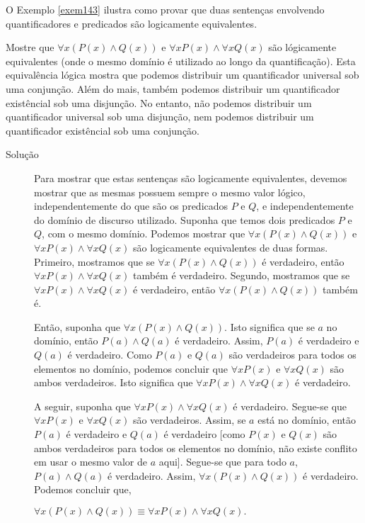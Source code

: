 O Exemplo \ref{exem143} ilustra como provar que duas sentenças envolvendo
quantificadores e predicados são logicamente equivalentes.

\label{exem143}
\begin{exmp}
Mostre que $\forall x(P(x) \land Q(x))$ e $\forall xP(x) \land \forall xQ(x)$
são lógicamente equivalentes (onde o mesmo domínio é utilizado ao longo da
quantificação). Esta equivalência lógica mostra que podemos distribuir um
quantificador universal sob uma conjunção. Além do mais, também podemos
distribuir um quantificador existêncial sob uma disjunção. No entanto, não
podemos distribuir um quantificador universal sob uma disjunção, nem podemos
distribuir um quantificador existêncial sob uma conjunção.
\end{exmp}

\begin{description}
\item[Solução] Para mostrar que estas sentenças são logicamente equivalentes,
devemos mostrar que as mesmas possuem sempre o mesmo valor lógico,
independentemente do que são os predicados $P$ e $Q$, e independentemente do
domínio de discurso utilizado. Suponha que temos dois predicados $P$ e $Q$, com
o mesmo domínio. Podemos mostrar que $\forall x(P(x) \land Q(x))$ e $\forall
xP(x) \land \forall xQ(x)$ são logicamente equivalentes de duas formas.
Primeiro, mostramos que se $\forall x(P(x) \land Q(x))$ é verdadeiro,
então $\forall xP(x) \land \forall xQ(x)$ também é verdadeiro. Segundo,
mostramos que se $\forall xP(x) \land \forall xQ(x)$ é verdadeiro, então
$\forall x(P(x) \land Q(x))$ também é.

Então, suponha que $\forall x(P(x) \land Q(x))$. Isto significa que se $a$ no
domínio, então $P(a) \land Q(a)$ é verdadeiro. Assim, $P(a)$ é verdadeiro e
$Q(a)$ é verdadeiro. Como $P(a)$ e $Q(a)$ são verdadeiros para todos os
elementos no domínio, podemos concluir que $\forall xP(x)$ e $\forall xQ(x)$ são
ambos verdadeiros. Isto significa que $\forall xP(x) \land \forall xQ(x)$ é
verdadeiro.

A seguir, suponha que $\forall xP(x) \land \forall xQ(x)$ é verdadeiro. Segue-se
que $\forall xP(x)$ e $\forall xQ(x)$ são verdadeiros. Assim, se $a$ está no
domínio, então $P(a)$ é verdadeiro e $Q(a)$ é verdadeiro [como $P(x)$ e
$Q(x)$ são ambos verdadeiros para todos os elementos no domínio, não existe
conflito em usar o mesmo valor de $a$ aqui]. Segue-se que para todo $a$, $P(a)
\land Q(a)$ é verdadeiro. Assim, $\forall x(P(x) \land Q(x))$ é verdadeiro.
Podemos concluir que,
\begin{center}
$\forall x(P(x) \land Q(x)) \equiv \forall xP(x) \land \forall xQ(x).$
\end{center}
\end{description}


